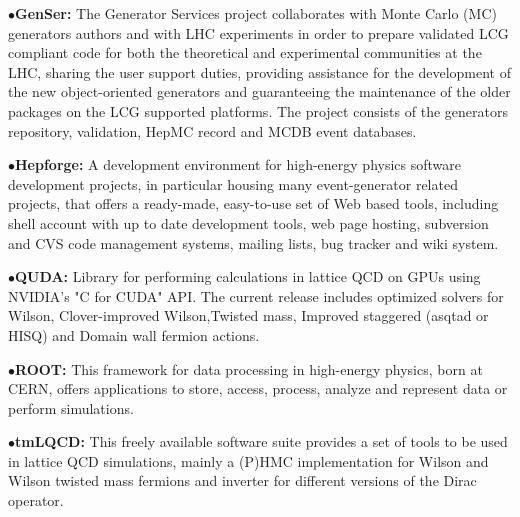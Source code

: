 \item{$\bullet$}{\bf GenSer:} The Generator Services project collaborates with Monte Carlo (MC) generators authors and with LHC experiments in order to prepare validated LCG compliant code for both the theoretical and experimental communities at the LHC, sharing the user support duties, providing assistance for the development of the new object-oriented generators and guaranteeing the maintenance of the older packages on the LCG supported platforms. The project consists of the generators repository, validation, HepMC record and MCDB event databases.
	\item{}

\medskip

\item{$\bullet$}{\bf Hepforge:}
A development environment for high-energy physics software development projects, in particular housing many event-generator related projects, that offers a ready-made, easy-to-use set of Web based tools, including shell account with up to date development tools, web page hosting, subversion and CVS code management systems, mailing lists, bug tracker and wiki system.
	\item{}

\medskip

\item{$\bullet$}{\bf QUDA:} 
Library for performing calculations in lattice QCD on GPUs using NVIDIA's "C for CUDA" API. The current release includes optimized solvers for Wilson, Clover-improved Wilson,Twisted mass, Improved staggered (asqtad or HISQ) and Domain wall fermion actions.
	\item{}

\medskip

\item{$\bullet$}{\bf ROOT:}
This framework for data processing in high-energy physics, born at CERN, offers applications to store, access, process, analyze and represent data or perform simulations.
	\item{}

\medskip

\item{$\bullet$}{\bf tmLQCD:} 
This freely available software suite provides a set of tools to be used in lattice QCD simulations, mainly a (P)HMC implementation for Wilson and Wilson twisted mass fermions and inverter for different versions of the Dirac operator.
	\item{}

